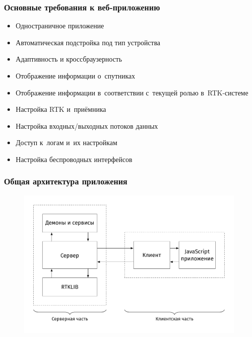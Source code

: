 \documentclass[xetex,t]{beamer}
\begin{document}
%
%
\begin{frame}
  \frametitle{Основные требования к веб-приложению}
  
  \begin{itemize}
    \item Одностраничное приложение
    \item Автоматическая подстройка под тип устройства
    \item Адаптивность и кроссбраузерность
  \end{itemize}
  \begin{center}
    \vskip -0.7cm
    \color{ifmoblue}{\rule{.5\textwidth}{0.5pt}}
  \end{center}
  \vskip -0.5cm
  \begin{itemize}
    \item Отображение информации о~спутниках
    \item Отображение информации в~соответствии с~текущей ролью в~RTK-системе
    \item Настройка RTK и~приёмника
    \item Настройка входных/выходных потоков данных
    \item Доступ к~логам и~их настройкам
    \item Настройка беспроводных интерфейсов
  \end{itemize}
\end{frame}


%
%
\begin{frame}
  \frametitle{Общая архитектура приложения}
  \vskip -0.75cm
  \begin{figure}[h]
    \centering
    \includegraphics[width=.95\textwidth]{../img/tikz/raw-system-architecture/pic}
  \end{figure}
\end{frame}
\end{document}
